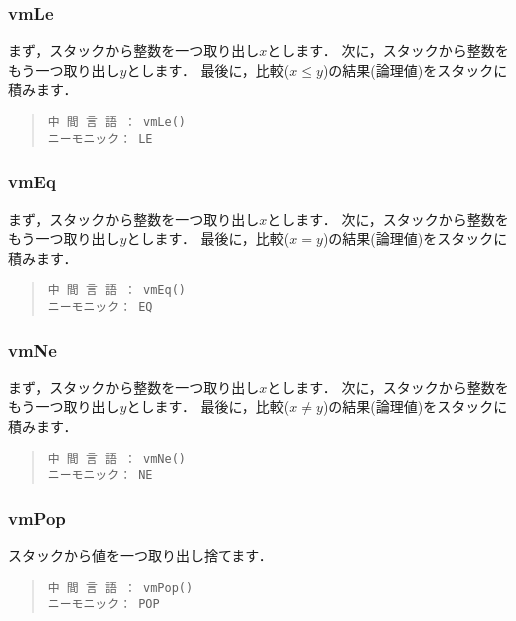 \subsubsection{vmLe}

まず，スタックから整数を一つ取り出し$x$とします．
次に，スタックから整数をもう一つ取り出し$y$とします．
最後に，比較($x \le y$)の結果(論理値)をスタックに積みます．

\begin{quote}
\begin{verbatim}
中 間 言 語 ： vmLe()
ニーモニック： LE
\end{verbatim}
\end{quote}

\subsubsection{vmEq}

まず，スタックから整数を一つ取り出し$x$とします．
次に，スタックから整数をもう一つ取り出し$y$とします．
最後に，比較($x = y$)の結果(論理値)をスタックに積みます．

\begin{quote}
\begin{verbatim}
中 間 言 語 ： vmEq()
ニーモニック： EQ
\end{verbatim}
\end{quote}

\subsubsection{vmNe}

まず，スタックから整数を一つ取り出し$x$とします．
次に，スタックから整数をもう一つ取り出し$y$とします．
最後に，比較($x \neq y$)の結果(論理値)をスタックに積みます．

\begin{quote}
\begin{verbatim}
中 間 言 語 ： vmNe()
ニーモニック： NE
\end{verbatim}
\end{quote}

\subsubsection{vmPop}

スタックから値を一つ取り出し捨てます．

\begin{quote}
\begin{verbatim}
中 間 言 語 ： vmPop()
ニーモニック： POP
\end{verbatim}
\end{quote}


